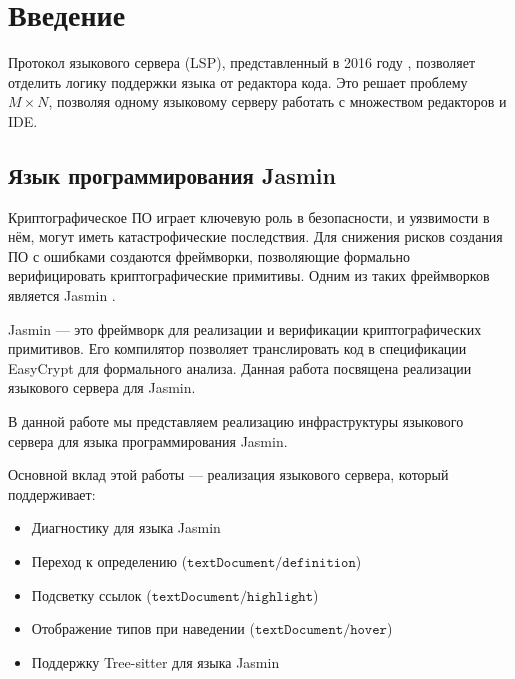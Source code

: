\chapter{Введение}
\label{chap:intro}
Протокол языкового сервера (LSP), представленный в 2016 году
\cite{language-server-protocol:2016}, позволяет отделить логику поддержки языка
от редактора кода. Это решает проблему $M \times N$, позволяя одному языковому
серверу работать с множеством редакторов и IDE.

\section{Язык программирования Jasmin}

Криптографическое ПО играет ключевую роль в безопасности, и уязвимости в нём,
могут иметь катастрофические последствия. Для снижения рисков создания ПО с
ошибками создаются фреймворки, позволяющие формально верифицировать
криптографические примитивы.  Одним из таких фреймворков является Jasmin
\cite{jasmin:2017}.

Jasmin — это фреймворк для реализации и верификации криптографических
примитивов. Его компилятор позволяет транслировать код в спецификации EasyCrypt
\cite{easycrypt:2013} для формального анализа. Данная работа посвящена
реализации языкового сервера для Jasmin.

В данной работе мы представляем реализацию инфраструктуры языкового сервера для
языка программирования Jasmin.

Основной вклад этой работы — реализация языкового сервера, который поддерживает:
\begin{itemize}
    \item Диагностику для языка Jasmin
    \item Переход к определению ($\texttt{textDocument/definition}$)
    \item Подсветку ссылок ($\texttt{textDocument/highlight}$)
    \item Отображение типов при наведении ($\texttt{textDocument/hover}$)
    \item Поддержку Tree-sitter для языка Jasmin
\end{itemize}